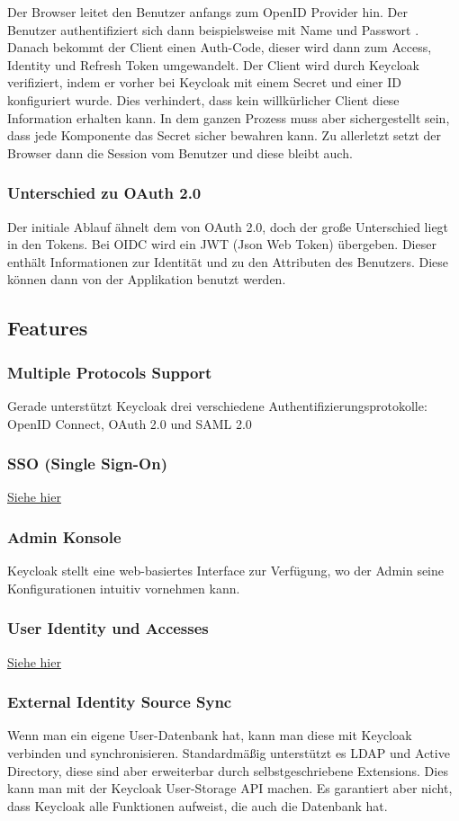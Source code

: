 Der Browser leitet den Benutzer anfangs zum OpenID Provider hin. Der Benutzer authentifiziert sich dann beispielsweise mit Name und Passwort .
Danach bekommt der Client einen Auth-Code, dieser wird dann zum Access, Identity und Refresh Token umgewandelt.
Der Client wird durch Keycloak verifiziert, indem er vorher bei Keycloak mit einem Secret und einer ID konfiguriert wurde. Dies verhindert, dass kein willkürlicher Client diese Information erhalten kann.
In dem ganzen Prozess muss aber sichergestellt sein, dass jede Komponente das Secret sicher bewahren kann.
Zu allerletzt setzt der Browser dann die Session vom Benutzer und diese bleibt auch. \cite{KeycloakCodeCentric}

\subsubsection{Unterschied zu OAuth 2.0}
Der initiale Ablauf ähnelt dem von OAuth 2.0, doch der große Unterschied liegt in den Tokens.
Bei OIDC wird ein JWT (Json Web Token) übergeben. Dieser enthält Informationen zur Identität und zu den Attributen des Benutzers.
Diese können dann von der Applikation benutzt werden. \cite{KeycloakCodeCentric}


\subsection{Features}
\subsubsection{Multiple Protocols Support}
Gerade unterstützt Keycloak drei verschiedene Authentifizierungsprotokolle: OpenID Connect, OAuth 2.0 und SAML 2.0 \cite{KeyCloakDZone}
\subsubsection{SSO (Single Sign-On)}
\hyperref[sec:SSO]{Siehe hier}
\subsubsection{Admin Konsole}
Keycloak stellt eine web-basiertes Interface zur Verfügung, wo der Admin seine Konfigurationen intuitiv vornehmen kann. \cite{KeyCloakDZone}
\subsubsection{User Identity und Accesses}
\hyperref[sec:IAM]{Siehe hier}
\subsubsection{External Identity Source Sync}
Wenn man ein eigene User-Datenbank  hat, kann man diese mit Keycloak verbinden und synchronisieren. Standardmäßig unterstützt es LDAP und Active Directory, diese sind aber
erweiterbar durch selbstgeschriebene Extensions. Dies kann man mit der Keycloak User-Storage API machen. Es garantiert aber nicht, dass Keycloak alle Funktionen aufweist,
die auch die Datenbank hat. \cite{KeyCloakDZone}
